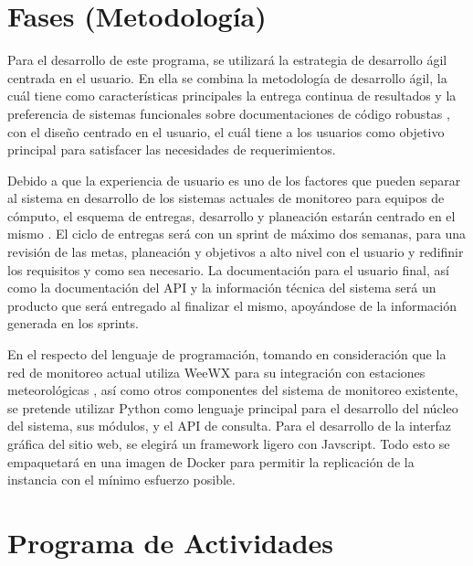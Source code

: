 \section{Fases (Metodología)}

Para el desarrollo de este programa, se utilizará la estrategia de desarrollo ágil centrada en el usuario. En ella se combina la metodología de desarrollo ágil, la cuál tiene como características principales la entrega continua de resultados y la preferencia de sistemas funcionales sobre documentaciones de código robustas \cite{agile_manifesto}, con el diseño centrado en el usuario, el cuál tiene a los usuarios como objetivo principal para satisfacer las necesidades de requerimientos.

Debido a que la experiencia de usuario es uno de los factores que pueden separar al sistema en desarrollo de los sistemas actuales de monitoreo para equipos de cómputo, el esquema de entregas, desarrollo y planeación estarán centrado en el mismo \cite{hussain_agile_usercentered}. El ciclo de entregas será con un sprint de máximo dos semanas, para una revisión de las metas, planeación y objetivos a alto nivel con el usuario y redifinir los requisitos y como sea necesario. La documentación para el usuario final, así como la documentación del API y la información técnica del sistema será un producto que será entregado al finalizar el mismo, apoyándose de la información generada en los sprints.

En el respecto del lenguaje de programación, tomando en consideración que la red de monitoreo actual utiliza WeeWX para su integración con estaciones meteorológicas \cite{red_climatologica_uacj}, así como otros componentes del sistema de monitoreo existente, se pretende utilizar Python como lenguaje principal para el desarrollo del núcleo del sistema, sus módulos, y el API de consulta. Para el desarrollo de la interfaz gráfica del sitio web, se elegirá un framework ligero con Javscript. Todo esto se empaquetará en una imagen de Docker para permitir la replicación de la instancia con el mínimo esfuerzo posible.

\section{Programa de Actividades}

